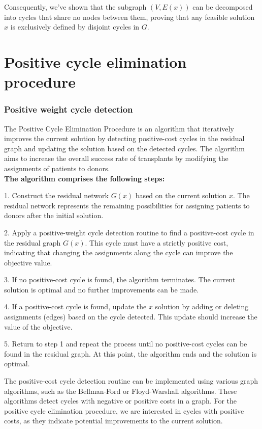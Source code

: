 \documentclass{ULBreport}
\begin{document}
Consequently, we've shown that the subgraph $(V, E(x))$ can be decomposed into cycles that share no nodes between them, proving that any feasible solution $x$ is exclusively defined by disjoint cycles in $G$.

\chapter{Positive cycle elimination procedure}

\subsection{Positive weight cycle detection}
The Positive Cycle Elimination Procedure is an algorithm that iteratively improves the current solution by detecting positive-cost cycles in the residual graph and updating the solution based on the detected cycles. The algorithm aims to increase the overall success rate of transplants by modifying the assignments of patients to donors.
\\

\textbf{The algorithm comprises the following steps:}

1. Construct the residual network $G(x)$ based on the current solution $x$. The residual network represents the remaining possibilities for assigning patients to donors after the initial solution.

2. Apply a positive-weight cycle detection routine to find a positive-cost cycle in the residual graph $G(x)$. This cycle must have a strictly positive cost, indicating that changing the assignments along the cycle can improve the objective value.

3. If no positive-cost cycle is found, the algorithm terminates. The current solution is optimal and no further improvements can be made.

4. If a positive-cost cycle is found, update the $x$ solution by adding or deleting assignments (edges) based on the cycle detected. This update should increase the value of the objective.

5. Return to step 1 and repeat the process until no positive-cost cycles can be found in the residual graph. At this point, the algorithm ends and the solution is optimal.

The positive-cost cycle detection routine can be implemented using various graph algorithms, such as the Bellman-Ford or Floyd-Warshall algorithms. These algorithms detect cycles with negative or positive costs in a graph. For the positive cycle elimination procedure, we are interested in cycles with positive costs, as they indicate potential improvements to the current solution.
\end{document}
